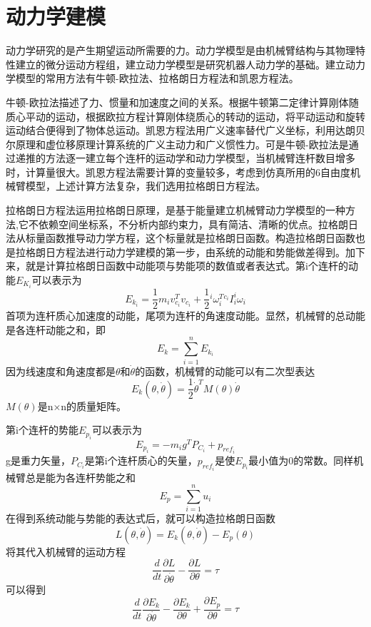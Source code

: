 \documentclass[12pt,a4paper,openany,oneside]{book}%
\numberwithin{equation}{chapter}%
\numberwithin{figure}{chapter}%
\begin{document}
\section{动力学建模}
动力学研究的是产生期望运动所需要的力。动力学模型是由机械臂结构与其物理特性建立的微分运动方程组，建立动力学模型是研究机器人动力学的基础。建立动力学模型的常用方法有牛顿-欧拉法、拉格朗日方程法和凯恩方程法。\par
牛顿-欧拉法描述了力、惯量和加速度之间的关系。根据牛顿第二定律计算刚体随质心平动的运动，根据欧拉方程计算刚体绕质心的转动的运动，将平动运动和旋转运动结合便得到了物体总运动。凯恩方程法用广义速率替代广义坐标，利用达朗贝尔原理和虚位移原理计算系统的广义主动力和广义惯性力。可是牛顿-欧拉法是通过递推的方法逐一建立每个连杆的运动学和动力学模型，当机械臂连杆数目增多时，计算量很大。凯恩方程法需要计算的变量较多，考虑到仿真所用的6自由度机械臂模型，上述计算方法复杂，我们选用拉格朗日方程法。\par
拉格朗日方程法运用拉格朗日原理，是基于能量建立机械臂动力学模型的一种方法,它不依赖空间坐标系，不分析内部约束力，具有简洁、清晰的优点。拉格朗日法从标量函数推导动力学方程，这个标量就是拉格朗日函数。构造拉格朗日函数也是拉格朗日方程法进行动力学建模的第一步，由系统的动能和势能做差得到。加下来，就是计算拉格朗日函数中动能项与势能项的数值或者表达式。第i个连杆的动能$E_{K_i}$可以表示为
\begin{equation}\label{lgrk1}
  E_{k_i}=\frac{1}{2}m_iv^T_{c_i}v_{c_i}+\frac{1}{2}{^{i}\omega^T_i} {^{c_i}I_i ^{i}\omega_i}
\end{equation}
首项为连杆质心加速度的动能，尾项为连杆的角速度动能。显然，机械臂的总动能是各连杆动能之和，即
\begin{equation}\label{lgrk2}
  E_k=\sum_{i=1}^{n} E_{k_i}
\end{equation}
因为线速度和角速度都是$\theta$和$\dot{\theta}$的函数，机械臂的动能可以有二次型表达
\begin{equation}\label{lgrk3}
  E_k(\theta,\dot{\theta})=\frac{1}{2}\dot{\theta}^TM(\theta)\dot{\theta}
\end{equation}
$M(\theta)$是n×n的质量矩阵。\par
第i个连杆的势能$E_{p_i}$可以表示为
\begin{equation}\label{lgrp1}
E_{p_i}=-m_ig^TP_{C_i}+p_{ref_i}
\end{equation}
g是重力矢量，$P_{C_i}$是第i个连杆质心的矢量，$p_{{ref}_i}$是使$E_{p_i}$最小值为0的常数。同样机械臂总是能为各连杆势能之和
\begin{equation}\label{lgrp2}
  E_p=\sum_{i=1}^{n} u_i
\end{equation}
在得到系统动能与势能的表达式后，就可以构造拉格朗日函数
\begin{equation}\label{lgr1}
  L(\theta,\dot{\theta})=E_k(\theta,\dot{\theta})-E_p(\theta)
\end{equation}
将其代入机械臂的运动方程
\begin{equation}\label{lgr2}
  \frac{d}{dt}\frac{\partial L}{\partial \dot{\theta}}-\frac{\partial L}{\partial \theta}=\tau
\end{equation}
可以得到
\begin{equation}\label{lgr3}
  \frac{d}{dt}\frac{\partial E_k}{\partial \dot{\theta}}-\frac{\partial {E_k}}{\partial \theta}+\frac{\partial {E_p}}{\partial \theta}=\tau
\end{equation}
\end{document}
